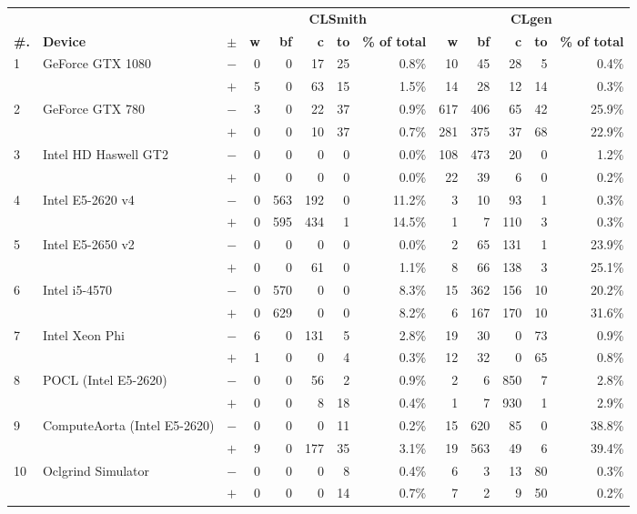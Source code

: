 \begin{tabular}{lll | rrrrr | rrrrr }
  \toprule
  & & & \multicolumn{5}{c|}{\textbf{CLSmith}} & \multicolumn{5}{c}{\textbf{CLgen}} \\
  \textbf{\#.} & \textbf{Device} & $\pm$ &
  \textbf{w} & \textbf{bf} & \textbf{c} & \textbf{to} & \textbf{\% of total} &
  \textbf{w} & \textbf{bf} & \textbf{c} & \textbf{to} & \textbf{\% of total} \\
  \midrule
  \multirow{ 2}{*}{1} & \multirow{ 2}{*}{GeForce GTX 1080} & $-$ & 0 & 0 & 17 & 25 & 0.8\%       & 10 & 45 & 28 & 5 & 0.4\% \\& & $+$ & 5 & 0 & 63 & 15 & 1.5\% & 14 & 28 & 12 & 14 & 0.3\% \\
\hline
\multirow{ 2}{*}{2} & \multirow{ 2}{*}{GeForce GTX 780} & $-$ & 3 & 0 & 22 & 37 & 0.9\%       & 617 & 406 & 65 & 42 & 25.9\% \\& & $+$ & 0 & 0 & 10 & 37 & 0.7\% & 281 & 375 & 37 & 68 & 22.9\% \\
\hline
\multirow{ 2}{*}{3} & \multirow{ 2}{*}{Intel HD Haswell GT2} & $-$ & 0 & 0 & 0 & 0 & 0.0\%       & 108 & 473 & 20 & 0 & 1.2\% \\& & $+$ & 0 & 0 & 0 & 0 & 0.0\% & 22 & 39 & 6 & 0 & 0.2\% \\
\hline
\multirow{ 2}{*}{4} & \multirow{ 2}{*}{Intel E5-2620 v4} & $-$ & 0 & 563 & 192 & 0 & 11.2\%       & 3 & 10 & 93 & 1 & 0.3\% \\& & $+$ & 0 & 595 & 434 & 1 & 14.5\% & 1 & 7 & 110 & 3 & 0.3\% \\
\hline
\multirow{ 2}{*}{5} & \multirow{ 2}{*}{Intel E5-2650 v2} & $-$ & 0 & 0 & 0 & 0 & 0.0\%       & 2 & 65 & 131 & 1 & 23.9\% \\& & $+$ & 0 & 0 & 61 & 0 & 1.1\% & 8 & 66 & 138 & 3 & 25.1\% \\
\hline
\multirow{ 2}{*}{6} & \multirow{ 2}{*}{Intel i5-4570} & $-$ & 0 & 570 & 0 & 0 & 8.3\%       & 15 & 362 & 156 & 10 & 20.2\% \\& & $+$ & 0 & 629 & 0 & 0 & 8.2\% & 6 & 167 & 170 & 10 & 31.6\% \\
\hline
\multirow{ 2}{*}{7} & \multirow{ 2}{*}{Intel Xeon Phi} & $-$ & 6 & 0 & 131 & 5 & 2.8\%       & 19 & 30 & 0 & 73 & 0.9\% \\& & $+$ & 1 & 0 & 0 & 4 & 0.3\% & 12 & 32 & 0 & 65 & 0.8\% \\
\hline
\multirow{ 2}{*}{8} & \multirow{ 2}{*}{POCL (Intel E5-2620)} & $-$ & 0 & 0 & 56 & 2 & 0.9\%       & 2 & 6 & 850 & 7 & 2.8\% \\& & $+$ & 0 & 0 & 8 & 18 & 0.4\% & 1 & 7 & 930 & 1 & 2.9\% \\
\hline
\multirow{ 2}{*}{9} & \multirow{ 2}{*}{ComputeAorta (Intel E5-2620)} & $-$ & 0 & 0 & 0 & 11 & 0.2\%       & 15 & 620 & 85 & 0 & 38.8\% \\& & $+$ & 9 & 0 & 177 & 35 & 3.1\% & 19 & 563 & 49 & 6 & 39.4\% \\
\hline
\multirow{ 2}{*}{10} & \multirow{ 2}{*}{Oclgrind Simulator} & $-$ & 0 & 0 & 0 & 8 & 0.4\%       & 6 & 3 & 13 & 80 & 0.3\% \\& & $+$ & 0 & 0 & 0 & 14 & 0.7\% & 7 & 2 & 9 & 50 & 0.2\% \\
  \bottomrule
\end{tabular}


